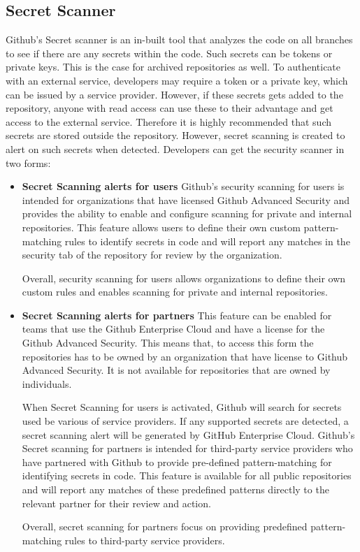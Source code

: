 \subsection{Secret Scanner}
Github's Secret scanner is an in-built tool that analyzes the code on all branches to see if there are any secrets within the code. Such secrets can be tokens or private keys. This is the case for archived repositories as well. To authenticate with an external service, developers may require a token or a private key, which can be issued by a service provider. However, if these secrets gets added to the repository, anyone with read access can use these to their advantage and get access to the external service. Therefore it is highly recommended that such secrets are stored outside the repository. However, secret scanning is created to alert on such secrets when detected. Developers can get the
security scanner in two forms: 
\begin{itemize}
    \item \textbf{Secret Scanning alerts for users}
Github's security scanning for users is intended for organizations that have licensed Github Advanced Security and provides the ability to enable and configure scanning for private and internal repositories. This feature allows users to define their own custom pattern-matching rules to identify secrets in code and will report any matches in the security tab of the repository for review by the organization. 

Overall, security scanning for users allows organizations to define their own custom rules and enables scanning for private and internal repositories.

\item \textbf{Secret Scanning alerts for partners}
This feature can be enabled for teams that use the Github Enterprise Cloud and have a license for the Github Advanced Security. This means that, to access this form the repositories has to be owned by an organization that have license to Github Advanced Security. It is not available for repositories that are owned by individuals. 

When Secret Scanning for users is activated, Github will search for secrets used be various of service providers. If any supported secrets are detected, a secret scanning alert will be generated by GitHub Enterprise Cloud.
Github's Secret scanning for partners is intended for  third-party service providers who have partnered with Github to provide pre-defined pattern-matching for identifying secrets in code. This feature is available for all public repositories and will report any matches of these predefined patterns directly to the relevant partner for their review and action. 

Overall, secret scanning for partners focus on providing predefined pattern-matching rules to third-party service providers. 
\cite{GithubSecretScanning}
\end{itemize}

